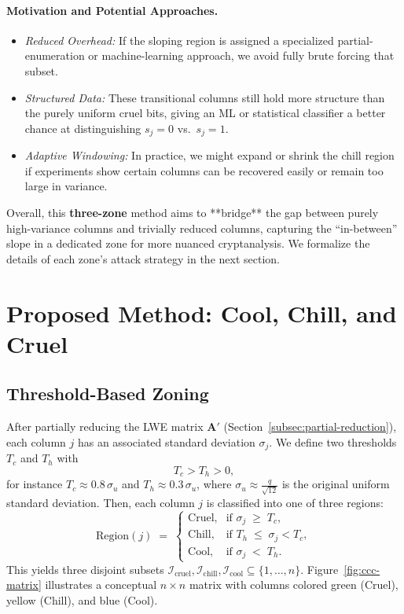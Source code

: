 \documentclass[conference]{IEEEtran}
\begin{document}
\paragraph{Motivation and Potential Approaches.}
\begin{itemize}
    \item \emph{Reduced Overhead:} If the sloping region is assigned a specialized partial-enumeration or machine-learning approach, we avoid fully brute forcing that subset.
    \item \emph{Structured Data:} These transitional columns still hold more structure than the purely uniform cruel bits, giving an ML or statistical classifier a better chance at distinguishing $s_j=0$ vs.\ $s_j=1$.
    \item \emph{Adaptive Windowing:} In practice, we might expand or shrink the chill region if experiments show certain columns can be recovered easily or remain too large in variance.
\end{itemize}

Overall, this \textbf{three-zone} method aims to **bridge** the gap between purely high-variance columns and trivially reduced columns, capturing the “in-between” slope in a dedicated zone for more nuanced cryptanalysis. We formalize the details of each zone’s attack strategy in the next section.

\section{Proposed Method: \texorpdfstring{Cool, Chill, and Cruel}{Cool, Chill, and Cruel}}
\label{sec:proposed-ccc}

\subsection{Threshold-Based Zoning}
\label{subsec:threshold-zoning}

After partially reducing the LWE matrix $\mathbf{A}'$ (Section~\ref{subsec:partial-reduction}), each column $j$ has an associated standard deviation $\sigma_j$. We define two thresholds $T_c$ and $T_h$ with 
\[
  T_c > T_h > 0,
\]
for instance $T_c \approx 0.8 \,\sigma_u$ and $T_h \approx 0.3\, \sigma_u$, where $\sigma_u \approx \frac{q}{\sqrt{12}}$ is the original uniform standard deviation. Then, each column $j$ is classified into one of three regions:
\[
  \mathrm{Region}(j) \;=\;
  \begin{cases}
    \text{Cruel}, & \text{if } \sigma_j \;\ge\; T_c,\\
    \text{Chill}, & \text{if } T_h \;\le\; \sigma_j < T_c,\\
    \text{Cool}, & \text{if } \sigma_j \;<\; T_h.
  \end{cases}
\]
This yields three disjoint subsets $\mathcal{I}_{\mathrm{cruel}}, \mathcal{I}_{\mathrm{chill}}, \mathcal{I}_{\mathrm{cool}} \subseteq \{1,\ldots,n\}$. Figure~\ref{fig:ccc-matrix} illustrates a conceptual $n\times n$ matrix with columns colored green (Cruel), yellow (Chill), and blue (Cool).
\end{document}
